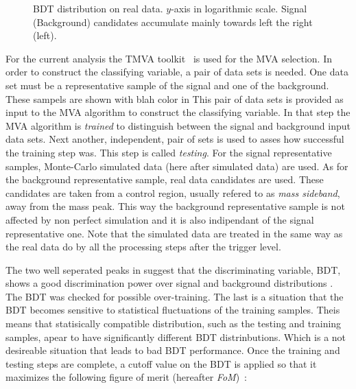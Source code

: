 \begin{figure}[h]
\begin{center}
  \scalebox{1}{}
  \caption{BDT distribution on real data. $y$-axis in logarithmic scale. Signal (Background) candidates accumulate mainly towards left the right (left). }
  \label{BTDG_performance}
\end{center}
\end{figure}

For the current analysis the TMVA toolkit~\cite{TMVA} is used for the MVA selection. In order to construct the classifying variable,
a pair of data sets is needed. One data set must be a representative sample of the signal and one of the background. {\color{red} These sampels are shown with blah color in }
This pair of data sets is provided as input to the MVA algorithm to construct the classifying variable.
In that step the MVA algorithm is {\it trained} to distinguish between the signal
and background input data sets. Next another, independent, pair of sets is used to asses how successful the training step was. This step is called {\it testing}.
For the signal representative samples, \BsJpsiKst Monte-Carlo simulated data (here after simulated data)
are used. As for the background representative sample, real data candidates are used. These candidates are taken from a control
region, usually refered to as {\it mass sideband}, away from the \BsJpsiKst mass peak. This way the background representative sample
is not affected by non perfect simulation and it is also indipendant of the signal representative one.
Note that the simulated data are treated in the same way as the real data do by all the processing steps after the \lone trigger level.

The two well seperated peaks in  suggest that the discriminating variable, BDT, shows a good discrimination
power over signal and background distributions .
The BDT was checked for possible over-training. The last is a situation that the BDT becomes sensitive to statistical fluctuations
of the training samples. Theis means that statisically compatible distribution, such as the testing and training samples,
apear to have significantly different BDT distrinbutions. Which is a not desireable situation that leads to bad BDT performance.
Once the training and testing steps are complete, a cutoff value on the BDT is applied so that it maximizes the following figure of merit
(hereafter {\it FoM})~\cite{Yuehong_fom}:

